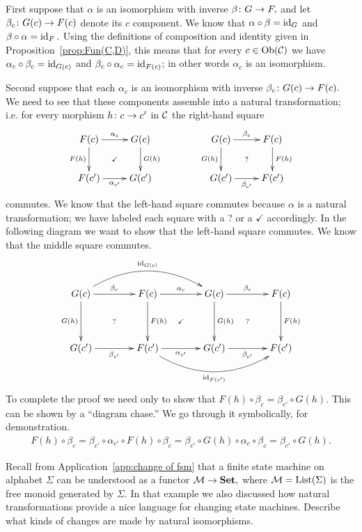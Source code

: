 \documentclass[../main/CT4S-EN-RU]{subfiles}
\begin{document}
\begin{proofENG}
First suppose that $\alpha$ is an isomorphism with inverse $\beta\colon G\rightarrow F,$ and let $\beta_c\colon G(c)\rightarrow F(c)$ denote its $c$ component. We know that $\alpha\circ\beta=\operatorname{id}_G$ and $\beta\circ\alpha=\operatorname{id}_F.$ Using the definitions of composition and identity given in Proposition~\ref{prop:Fun(C,D)}, this means that for every $c\in\operatorname{Ob}(\mathcal{C})$ we have $\alpha_c\circ\beta_c=\operatorname{id}_{G(c)}$ and $\beta_c\circ\alpha_c=\operatorname{id}_{F(c)}$; in other words $\alpha_c$ is an isomorphism.

Second suppose that each $\alpha_c$ is an isomorphism with inverse $\beta_c\colon G(c)\rightarrow F(c).$ We need to see that these components assemble into a natural transformation; i.e. for every morphism $h\colon c\rightarrow c'$ in $\mathcal{C}$ the right-hand square 
$$
\xymatrix{F(c)\ar@{}[dr]|{\checkmark}\ar[d]_{F(h)}\ar[r]^{\alpha_c}&G(c)\ar[d]^{G(h)}\\F(c')\ar[r]_{\alpha_{c'}}&G(c')}\hspace{.5in}
\xymatrix{G(c)\ar@{}[dr]|{?}\ar[d]_{G(h)}\ar[r]^{\beta_c}&F(c)\ar[d]^{F(h)}\\G(c')\ar[r]_{\beta_{c'}}&F(c')}
$$
commutes. We know that the left-hand square commutes because $\alpha$ is a natural transformation; we have labeled each square with a ? or a $\checkmark$ accordingly. In the following diagram we want to show that the left-hand square commutes. We know that the middle square commutes.
$$
\xymatrix@=40pt{G(c)\ar@/^2pc/[rr]^{\id_{G(c)}}\ar@{}[dr]|{?}\ar[d]_{G(h)}\ar[r]^{\beta_c}&F(c)\ar@{}[dr]|{\checkmark}\ar[d]^{F(h)}\ar[r]^{\alpha_c}&G(c)\ar@{}[dr]|{?}\ar[d]^{G(h)}\ar[r]^{\beta_c}&F(c)\ar[d]^{F(h)}\\
G(c')\ar[r]_{\beta_{c'}}&F(c')\ar[r]_{\alpha_{c'}}\ar@/_2pc/[rr]_{\id_{F(c')}}&G(c')\ar[r]_{\beta_{c'}}&F(c')}
$$
To complete the proof we need only to show that $F(h)\circ\beta_c=\beta_{c'}\circ G(h).$ This can be shown by a “diagram chase.” We go through it symbolically, for demonstration.
\begin{align*}
F(h)\circ\beta_c=\beta_{c'}\circ\alpha_{c'}\circ F(h)\circ\beta_c=\beta_{c'}\circ G(h)\circ\alpha_c\circ\beta_c=\beta_{c'}\circ G(h).
\end{align*}
\end{proofENG}

\begin{proofRUS}
\end{proofRUS}

\begin{exerciseENG}
Recall from Application~\ref{app:change of fsm} that a finite state machine on alphabet $\Sigma$ can be understood as a functor $\mathcal{M}\rightarrow{\mathbf{Set}},$ where $\mathcal{M}=\operatorname{List}(\Sigma)$ is the free monoid generated by $\Sigma.$ In that example we also discussed how natural transformations provide a nice language for changing state machines. Describe what kinds of changes are made by natural isomorphisms.
\end{exerciseENG}
\end{document}
